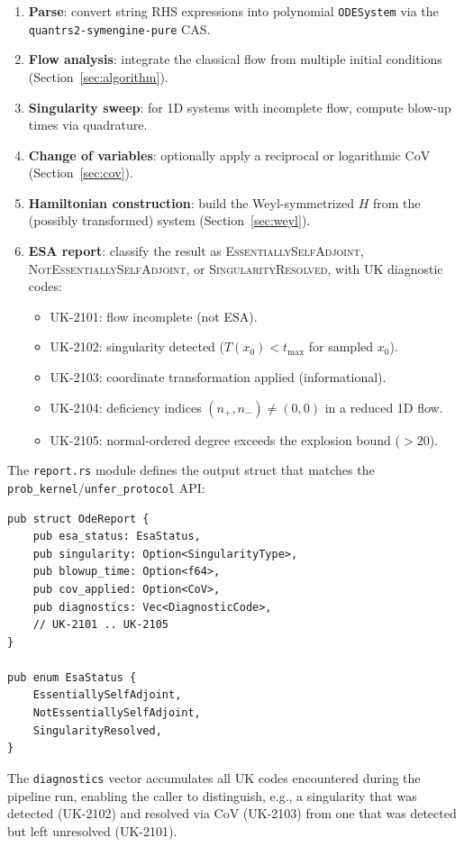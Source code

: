 \documentclass[11pt,a4paper]{article}
\begin{document}
\begin{enumerate}
  \item \textbf{Parse}: convert string RHS expressions into polynomial
    \texttt{ODESystem} via the \texttt{quantrs2-symengine-pure} CAS.
  \item \textbf{Flow analysis}: integrate the classical flow from
    multiple initial conditions (Section~\ref{sec:algorithm}).
  \item \textbf{Singularity sweep}: for 1D systems with incomplete flow,
    compute blow-up times via quadrature.
  \item \textbf{Change of variables}: optionally apply a reciprocal or
    logarithmic CoV (Section~\ref{sec:cov}).
  \item \textbf{Hamiltonian construction}: build the Weyl-symmetrized
    $H$ from the (possibly transformed) system
    (Section~\ref{sec:weyl}).
  \item \textbf{ESA report}: classify the result as
    \textsc{EssentiallySelfAdjoint},
    \textsc{NotEssentiallySelfAdjoint}, or
    \textsc{SingularityResolved}, with UK diagnostic codes:
    \begin{itemize}
      \item UK-2101: flow incomplete (not ESA).
      \item UK-2102: singularity detected ($T(x_{0})<t_{\max}$ for
        sampled $x_{0}$).
      \item UK-2103: coordinate transformation applied (informational).
      \item UK-2104: deficiency indices $(n_{+},n_{-})\neq(0,0)$ in a
        reduced 1D flow.
      \item UK-2105: normal-ordered degree exceeds the explosion bound
        ($>20$).
    \end{itemize}
\end{enumerate}

The \texttt{report.rs} module defines the output struct that matches the
\texttt{prob\_kernel}/\texttt{unfer\_protocol} API:
\begin{lstlisting}[language={},caption={\texttt{report.rs}}]
pub struct OdeReport {
    pub esa_status: EsaStatus,
    pub singularity: Option<SingularityType>,
    pub blowup_time: Option<f64>,
    pub cov_applied: Option<CoV>,
    pub diagnostics: Vec<DiagnosticCode>,
    // UK-2101 .. UK-2105
}

pub enum EsaStatus {
    EssentiallySelfAdjoint,
    NotEssentiallySelfAdjoint,
    SingularityResolved,
}
\end{lstlisting}
The \texttt{diagnostics} vector accumulates all UK codes encountered
during the pipeline run, enabling the caller to distinguish, e.g., a
singularity that was detected (UK-2102) and resolved via CoV (UK-2103)
from one that was detected but left unresolved (UK-2101).
\end{document}
